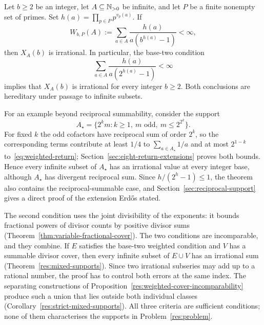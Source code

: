 \documentclass[11pt]{article}
\begin{document}
\begin{theorem}
\label{res:weighted-support}
Let $b\ge2$ be an integer, let $A\subseteq\mathbb{N}_{>0}$ be infinite, and let $P$
be a finite nonempty set of primes.  Set
$h(a)=\prod_{p\in P}p^{v_p(a)}$.  If
\begin{equation}\label{eq:weighted-fixed-base}
 W_{b,P}(A):=\sum_{a\in A}
 \frac{h(a)}{a(b^{h(a)}-1)}<\infty,
\end{equation}
then $X_A(b)$ is irrational.  In particular, the base-two condition
\begin{equation*}\label{eq:weighted-return}
 \sum_{a\in A}\frac{h(a)}{a(2^{h(a)}-1)}<\infty
 \tag{W}
\end{equation*}
implies that $X_A(b)$ is irrational for every integer $b\ge2$.  Both
conclusions are hereditary under passage to infinite subsets.
\end{theorem}

For an example beyond reciprocal summability, consider the support
\[
 A_\star=\{2^km:k\ge1,\ m\text{ odd},\ m\le2^{2^k}\}.
\]
For fixed $k$ the odd cofactors have reciprocal sum of order $2^k$, so
the corresponding terms contribute at least $1/4$ to
$\sum_{a\in A_\star}1/a$ and at most $2^{1-k}$
to~\eqref{eq:weighted-return}; Section~\ref{sec:eight-return-extensions}
proves both bounds. Hence every infinite subset of $A_\star$ has an
irrational value at every integer base, although $A_\star$ has divergent
reciprocal sum. Since $h/(2^h-1)\le1$, the theorem also contains the
reciprocal-summable case, and Section~\ref{sec:reciprocal-support}
gives a direct proof of the extension Erd\H{o}s stated.

The second condition uses the joint divisibility of the exponents: it
bounds fractional powers of divisor counts by positive divisor sums
(Theorem~\ref{thm:variable-fractional-cover}). The two conditions are
incomparable, and they combine. If $E$ satisfies the base-two weighted
condition and $V$ has a summable divisor cover, then every infinite
subset of $E\cup V$ has an irrational sum
(Theorem~\ref{res:mixed-supports}). Since two irrational subseries may
add up to a rational number, the proof has to control both errors at
the same index. The separating constructions of
Proposition~\ref{res:weighted-cover-incomparability} produce such a
union that lies outside both individual classes
(Corollary~\ref{res:strict-mixed-supports}). All three criteria are
sufficient conditions; none of them characterises the supports in
Problem~\ref{res:problem}.
\end{document}
